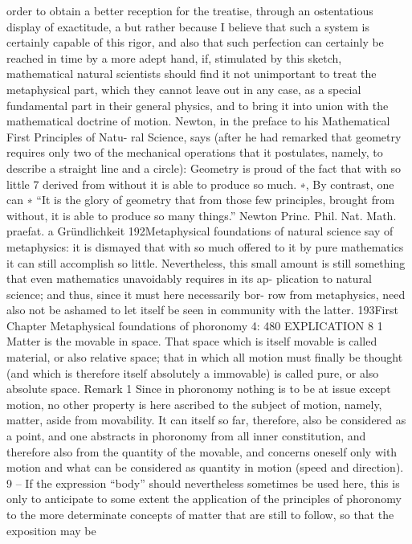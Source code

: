 order to obtain a better reception for the treatise, through an ostentatious
display of exactitude, a but rather because I believe that such a system is
certainly capable of this rigor, and also that such perfection can certainly
be reached in time by a more adept hand, if, stimulated by this sketch,
mathematical natural scientists should ﬁnd it not unimportant to treat
the metaphysical part, which they cannot leave out in any case, as a special
fundamental part in their general physics, and to bring it into union with
the mathematical doctrine of motion.
Newton, in the preface to his Mathematical First Principles of Natu-
ral Science, says (after he had remarked that geometry requires only two
of the mechanical operations that it postulates, namely, to describe a
straight line and a circle): Geometry is proud of the fact that with so little
7
derived from without it is able to produce so much. ∗, By contrast, one can
∗ “It is the glory of geometry that from those few principles, brought from
without, it is able to produce so many things.” Newton Princ. Phil. Nat. Math.
praefat.
a Gründlichkeit
192Metaphysical foundations of natural science
say of metaphysics: it is dismayed that with so much offered to it by pure
mathematics it can still accomplish so little. Nevertheless, this small amount
is still something that even mathematics unavoidably requires in its ap-
plication to natural science; and thus, since it must here necessarily bor-
row from metaphysics, need also not be ashamed to let itself be seen in
community with the latter.
193First Chapter
Metaphysical foundations of phoronomy
4: 480
EXPLICATION 8 1
Matter is the movable in space. That space which is itself movable is
called material, or also relative space; that in which all motion must ﬁnally
be thought (and which is therefore itself absolutely a immovable) is called
pure, or also absolute space.
Remark 1
Since in phoronomy nothing is to be at issue except motion, no other
property is here ascribed to the subject of motion, namely, matter, aside
from movability. It can itself so far, therefore, also be considered as a
point, and one abstracts in phoronomy from all inner constitution, and
therefore also from the quantity of the movable, and concerns oneself
only with motion and what can be considered as quantity in motion
(speed and direction). 9 – If the expression “body” should nevertheless
sometimes be used here, this is only to anticipate to some extent the
application of the principles of phoronomy to the more determinate
concepts of matter that are still to follow, so that the exposition may be
